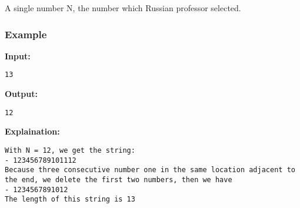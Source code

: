     A single number N, the number which Russian professor selected.   



\subsubsection{    Example   }

\textbf{    Input:   }
\begin{verbatim}
13\end{verbatim}

\textbf{    Output:   }
\begin{verbatim}
12\end{verbatim}

\textbf{    Explaination:   }
\begin{verbatim}
With N = 12, we get the string:
- 123456789101112
Because three consecutive number one in the same location adjacent to the end, we delete the first two numbers, then we have
- 1234567891012
The length of this string is 13\end{verbatim}